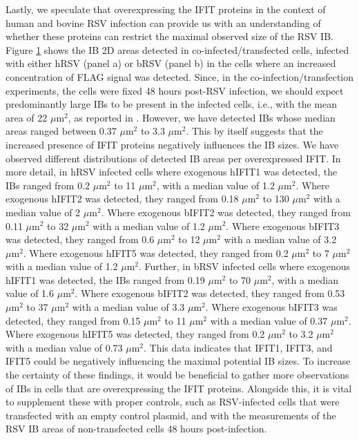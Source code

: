 \begin{figure}
    \label{fig:Distribution_IB_Areas_coInfected_Transfected_Cells_IFIT_RSV}
\end{figure}

Lastly, we speculate that overexpressing the IFIT proteins in the context of human and bovine RSV infection can provide us with an understanding of whether these proteins can restrict the maximal observed size of the RSV IB. Figure \ref{fig:Distribution_IB_Areas_coInfected_Transfected_Cells_IFIT_RSV} shows the IB 2D areas detected in co-infected/transfected cells, infected with either hRSV (panel a) or bRSV (panel b) in the cells where an increased concentration of FLAG signal was detected. Since, in the co-infection/transfection experiments, the cells were fixed 48 hours post-RSV infection, we should expect predominantly large IBs to be present in the infected cells, i.e., with the mean area of 22 \(\mu \mbox{m}^2\), as reported in \cite{Jobe2021BovineResponses}. However, we have detected IBs whose median areas ranged between 0.37 \(\mu \mbox{m}^2\) to 3.3 \(\mu \mbox{m}^2\). This by itself suggests that the increased presence of IFIT proteins negatively influences the IB sizes. We have observed different distributions of detected IB areas per overexpressed IFIT. In more detail, in hRSV infected cells where exogenous hIFIT1 was detected, the IBs ranged from 0.2 \(\mu \mbox{m}^2\) to 11 \(\mu \mbox{m}^2\), with a median value of 1.2 \(\mu \mbox{m}^2\). Where exogenous hIFIT2 was detected, they ranged from 0.18 \(\mu \mbox{m}^2\) to 130 \(\mu \mbox{m}^2\) with a median value of 2 \(\mu \mbox{m}^2\). Where exogenous bIFIT2 was detected, they ranged from 0.11 \(\mu \mbox{m}^2\) to 32 \(\mu \mbox{m}^2\) with a median value of 1.2 \(\mu \mbox{m}^2\). Where exogenous bIFIT3 was detected, they ranged from 0.6 \(\mu \mbox{m}^2\) to 12 \(\mu \mbox{m}^2\) with a median value of 3.2 \(\mu \mbox{m}^2\). Where exogenous hIFIT5 was detected, they ranged from 0.2 \(\mu \mbox{m}^2\) to 7 \(\mu \mbox{m}^2\) with a median value of 1.2 \(\mu \mbox{m}^2\). Further, in bRSV infected cells where exogenous hIFIT1 was detected, the IBs ranged from 0.19 \(\mu \mbox{m}^2\) to 70 \(\mu \mbox{m}^2\), with a median value of 1.6 \(\mu \mbox{m}^2\). Where exogenous bIFIT2 was detected, they ranged from 0.53 \(\mu \mbox{m}^2\) to 37 \(\mu \mbox{m}^2\) with a median value of 3.3 \(\mu \mbox{m}^2\). Where exogenous bIFIT3 was detected, they ranged from 0.15 \(\mu \mbox{m}^2\) to 11 \(\mu \mbox{m}^2\) with a median value of 0.37 \(\mu \mbox{m}^2\). Where exogenous hIFIT5 was detected, they ranged from 0.2 \(\mu \mbox{m}^2\) to 3.2 \(\mu \mbox{m}^2\) with a median value of 0.73 \(\mu \mbox{m}^2\). This data indicates that IFIT1, IFIT3, and IFIT5 could be negatively influencing the maximal potential IB sizes. To increase the certainty of these findings, it would be beneficial to gather more observations of IBs in cells that are overexpressing the IFIT proteins. Alongside this, it is vital to supplement these with proper controls, such as RSV-infected cells that were transfected with an empty control plasmid, and with the measurements of the RSV IB areas of non-transfected cells 48 hours post-infection.


